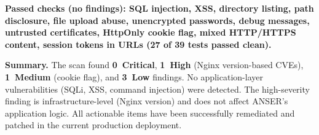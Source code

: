 \documentclass[11pt,a4paper]{report}
\begin{document}
\noindent\textbf{Passed checks (no findings): SQL injection, XSS, directory listing, path disclosure, file upload abuse, unencrypted passwords, debug messages, untrusted certificates, HttpOnly cookie flag, mixed HTTP/HTTPS content, session tokens in URLs (27 of 39 tests passed clean).}

\medskip
\noindent\textbf{Summary.} The scan found \textbf{0~Critical}, \textbf{1~High} (Nginx version-based CVEs), \textbf{1~Medium} (cookie flag), and \textbf{3~Low} findings. No application-layer vulnerabilities (SQLi, XSS, command injection) were detected. The high-severity finding is infrastructure-level (Nginx version) and does not affect ANSER's application logic. All actionable items have been successfully remediated and patched in the current production deployment.

\renewcommand{\bibname}{References}

\end{document}
